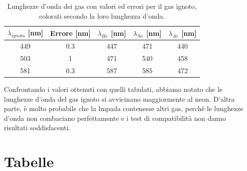 \documentclass[letterpaper,12pt]{article}
\begin{document}
\begin{table}[h!]
    \centering
    \begin{tabular}{|c|c|c|c|c|}
    \hline
    \textbf{$\lambda_{ignota}$} [nm] & \textbf{Errore} [nm] & \textbf{$\lambda_{He}$} [nm] & \textbf{$\lambda_{Ne}$} [nm] & \textbf{$\lambda_{Ar}$} [nm]\\
    \hline
    \cellcolor{wavelength_449} 449 & \cellcolor{wavelength_nan}0.3 & \cellcolor{wavelength_447} 447 & \cellcolor{wavelength_471} 471 & \cellcolor{wavelength_440} 440 \\
    \hline
    \cellcolor{wavelength_503} 503 & \cellcolor{wavelength_nan}1 & \cellcolor{wavelength_471} 471 & \cellcolor{wavelength_540} 540 & \cellcolor{wavelength_458} 458 \\
    \hline
    \cellcolor{wavelength_581} 581 & \cellcolor{wavelength_nan}0.3 & \cellcolor{wavelength_587} 587 & \cellcolor{wavelength_585} 585 & \cellcolor{wavelength_472} 472 \\
    \hline
    \end{tabular}
    \caption{Lunghezze d'onda dei gas con valori ed errori per il gas ignoto, colorati secondo la loro lunghezza d'onda.}
    \label{tab:reticolo_ignoto}
\end{table}

Confrontando i valori ottenuti con quelli tabulati, abbiamo notato che le lunghezze d'onda del gas ignoto si avvicinano
maggiormente al neon. D'altra parte, è molto probabile che la lmpada contenesse altri gas, perchè le lunghezze d'onda
non combaciano perfettamente e i test di compatibilità non danno risultati soddisfacenti. \\ 

\newpage
\section{Tabelle}
\end{document}
